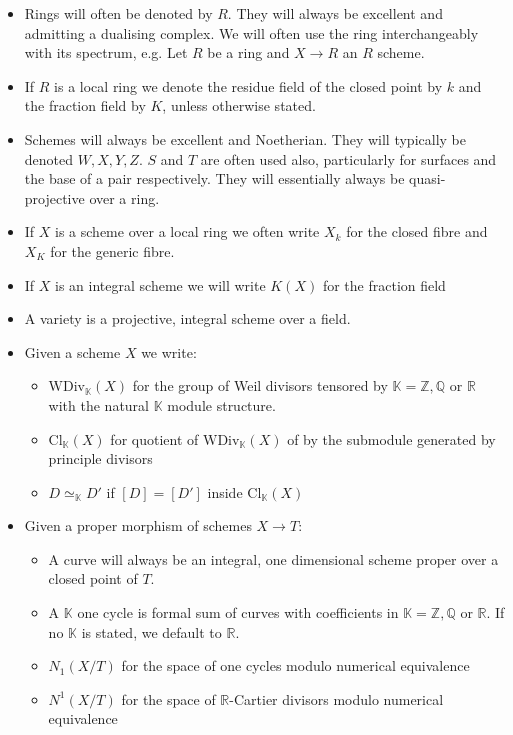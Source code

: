 \documentclass[a4paper,12pt]{book}
\begin{document}
	\begin{itemize}
		\item Rings will often be denoted by $R$. They will always be excellent and admitting a dualising complex. We will often use the ring interchangeably with its spectrum, e.g. Let $R$ be a ring and $X \to R$ an $R$ scheme.
		\item If $R$ is a local ring we denote the residue field of the closed point by $k$ and the fraction field by $K$, unless otherwise stated.
		\item Schemes will always be excellent  and Noetherian. They will typically be denoted $W,X,Y,Z$. $S$ and $T$ are often used also, particularly for surfaces and the base of a pair respectively. They will essentially always be quasi-projective over a ring.
		\item If $X$ is a scheme over a local ring we often write $X_{k}$ for the closed fibre and $X_{K}$ for the generic fibre.
		\item If $X$ is an integral scheme we will write $K(X)$ for the fraction field
		\item A variety is a projective, integral scheme over a field.
		\item Given a scheme $X$ we write:
		\begin{itemize}
			\item $\text{WDiv}_{\mathbb{K}}(X)$ for the group of Weil divisors tensored by $\mathbb{K}=\mathbb{Z},\mathbb{Q}$ or $\mathbb{R}$ with the natural $\mathbb{K}$ module structure.
			\item $\text{Cl}_{\mathbb{K}}(X)$ for quotient of $\text{WDiv}_{\mathbb{K}}(X)$ of by the submodule generated by principle divisors
			\item $D \simeq_{\mathbb{K}}D'$ if $[D] =[D']$ inside $\text{Cl}_{\mathbb{K}}(X)$
		\end{itemize}
		\item Given a proper morphism of schemes $X \to T$:
		\begin{itemize}
			\item A curve will always be an integral, one dimensional scheme proper over a closed point of $T$.
			\item A $\mathbb{K}$ one cycle is formal sum of curves with coefficients in $\mathbb{K}=\mathbb{Z},\mathbb{Q}$ or $\mathbb{R}$. If no $\mathbb{K}$ is stated, we default to $\mathbb{R}$.
			\item $N_{1}(X/T)$ for the space of one cycles modulo numerical equivalence
			\item $N^{1}(X/T)$ for the space of $\mathbb{R}$-Cartier divisors modulo numerical equivalence

\end{itemize}
\end{itemize}
\end{document}
